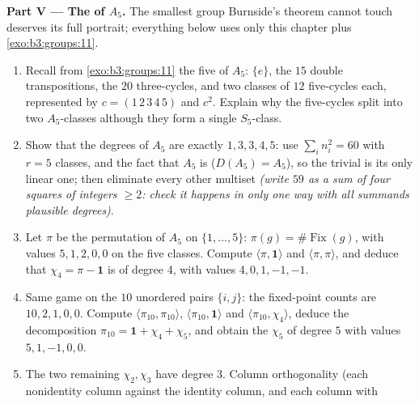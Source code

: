 \begin{problem}
\medskip
\noindent\textbf{Part V --- The  of $A_5$.} The
smallest group Burnside's theorem cannot touch deserves its full
portrait; everything below uses only this chapter plus
\cref{exo:b3:groups:11}.
\begin{enumerate}[resume]
  \item Recall from \cref{exo:b3:groups:11} the five  of $A_5$: $\{e\}$, the $15$ double
        transpositions, the $20$ three-cycles, and two classes
        of $12$ five-cycles each, represented by $c =
        (1\,2\,3\,4\,5)$ and $c^2$. Explain why the five-cycles
        split into two $A_5$-classes although they form a single
        $S_5$-class.
  \item Show that the  degrees of $A_5$ are exactly
        $1, 3, 3, 4, 5$: use $\sum_in_i^2 = 60$ with $r = 5$
        classes, and the fact that $A_5$ is  ($D(A_5) =
        A_5$), so the trivial  is its only linear one;
        then eliminate every other multiset \emph{(write $59$
        as a sum of four squares of integers $\geq 2$: check it
        happens in only one way with all summands plausible
        degrees)}.
  \item Let $\pi$ be the permutation  of $A_5$ on
        $\{1, \dots, 5\}$: $\pi(g) = \#\operatorname{Fix}(g)$,
        with values $5, 1, 2, 0, 0$ on the five classes. Compute
        $\langle\pi, \mathbf 1\rangle$ and $\langle\pi,
        \pi\rangle$, and deduce that $\chi_4 = \pi - \mathbf 1$
        is  of degree $4$, with values $4, 0, 1, -1,
        -1$.
  \item Same game on the $10$ unordered pairs $\{i, j\}$: the
        fixed-point counts are $10, 2, 1, 0, 0$. Compute
        $\langle\pi_{10}, \pi_{10}\rangle$, $\langle\pi_{10},
        \mathbf 1\rangle$ and $\langle\pi_{10}, \chi_4\rangle$,
        deduce the decomposition $\pi_{10} = \mathbf 1 + \chi_4
        + \chi_5$, and obtain the  $\chi_5$ of degree
        $5$ with values $5, 1, -1, 0, 0$.
  \item The two remaining  $\chi_2, \chi_3$ have
        degree $3$. Column orthogonality (each nonidentity
        column against the identity column, and each column with

\end{enumerate}
\end{problem}

